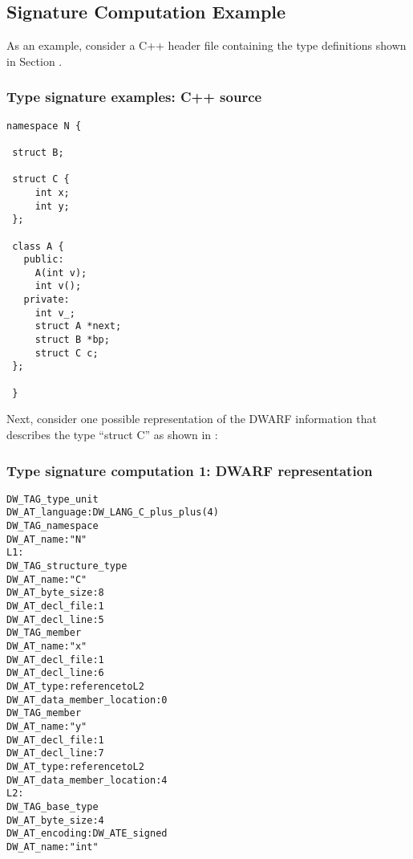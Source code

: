 \subsection{Signature Computation Example}
\label{app:signaturecomputationexample}

As an example, consider a C++ header file 
containing the type definitions shown
in Section .

\subsubsection{ Type signature examples: C++ source}
\label{app:typesignatureexamplescsource}
\begin{lstlisting}
namespace N {

 struct B;

 struct C {
     int x;
     int y;
 };

 class A {
   public:
     A(int v);
     int v();
   private:
     int v_;
     struct A *next;
     struct B *bp;
     struct C c;
 };

 }
\end{lstlisting}

Next, consider one possible representation of the DWARF
information that describes the type “struct C” as shown
in 
:

\subsubsection{Type signature  computation 1: DWARF representation}
\label{app:typesignaturecomputation1dwarfrepresentation}

\begin{alltt}
  DW\_TAG\_type\_unit
      DW\_AT\_language: DW\_LANG\_C\_plus\_plus (4)
    DW\_TAG\_namespace
        DW\_AT\_name: "N"
L1:
      DW\_TAG\_structure\_type
          DW\_AT\_name: "C"
          DW\_AT\_byte\_size: 8
          DW\_AT\_decl\_file: 1
          DW\_AT\_decl\_line: 5
        DW\_TAG\_member
            DW\_AT\_name: "x"
            DW\_AT\_decl\_file: 1
            DW\_AT\_decl\_line: 6
            DW\_AT\_type: reference to L2
            DW\_AT\_data\_member\_location: 0
        DW\_TAG\_member
            DW\_AT\_name: "y"
            DW\_AT\_decl\_file: 1
            DW\_AT\_decl\_line: 7
            DW\_AT\_type: reference to L2
            DW\_AT\_data\_member\_location: 4
L2:
     DW\_TAG\_base\_type
         DW\_AT\_byte\_size: 4
         DW\_AT\_encoding: DW\_ATE\_signed
         DW\_AT\_name: "int"
\end{alltt}

